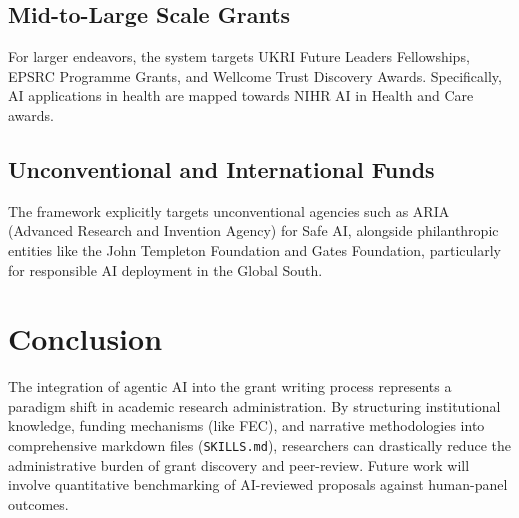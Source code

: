 \documentclass[11pt, a4paper]{article}
\begin{document}
\subsection{Mid-to-Large Scale Grants}
For larger endeavors, the system targets UKRI Future Leaders Fellowships, EPSRC Programme Grants, and Wellcome Trust Discovery Awards. Specifically, AI applications in health are mapped towards NIHR AI in Health and Care awards.

\subsection{Unconventional and International Funds}
The framework explicitly targets unconventional agencies such as ARIA (Advanced Research and Invention Agency) for Safe AI, alongside philanthropic entities like the John Templeton Foundation and Gates Foundation, particularly for responsible AI deployment in the Global South.

\section{Conclusion}
The integration of agentic AI into the grant writing process represents a paradigm shift in academic research administration. By structuring institutional knowledge, funding mechanisms (like FEC), and narrative methodologies into comprehensive markdown files (\texttt{SKILLS.md}), researchers can drastically reduce the administrative burden of grant discovery and peer-review. Future work will involve quantitative benchmarking of AI-reviewed proposals against human-panel outcomes.



\end{document}
